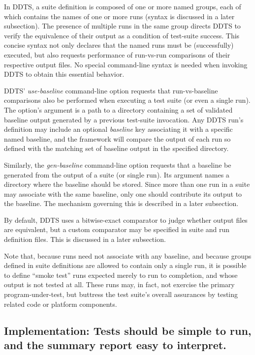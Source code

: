 \documentclass[conference]{IEEEtran}
\begin{document}
In DDTS, a suite definition is composed of one or more named groups, each of which contains the names of one or more runs (syntax is discussed in a later subsection). The presence of multiple runs in the same group directs DDTS to verify the equivalence of their output as a condition of test-suite success. This concise syntax not only declares that the named runs must be (successfully) executed, but also requests performance of run-vs-run comparisons of their respective output files. No special command-line syntax is needed when invoking DDTS to obtain this essential behavior.

DDTS' \emph{use-baseline} command-line option requests that run-vs-baseline comparisons also be performed when executing a test suite (or even a single run). The option's argument is a path to a directory containing a set of validated baseline output generated by a previous test-suite invocation. Any DDTS run's definition may include an optional \emph{baseline} key associating it with a specific named baseline, and the framework will compare the output of each run so defined with the matching set of baseline output in the specified directory.

Similarly, the \emph{gen-baseline} command-line option requests that a baseline be generated from the output of a suite (or single run). Its argument names a directory where the baseline should be stored. Since more than one run in a suite may associate with the same baseline, only one should contribute its output to the baseline. The mechanism governing this is described in a later subsection.

By default, DDTS uses a bitwise-exact comparator to judge whether output files are equivalent, but a custom comparator may be specified in suite and run definition files. This is discussed in a later subsection.

Note that, because runs need not associate with any baseline, and because groups defined in suite definitions are allowed to contain only a single run, it is possible to define ``smoke test'' runs expected merely to run to completion, and whose output is not tested at all. These runs may, in fact, not exercise the primary program-under-test, but buttress the test suite's overall assurances by testing related code or platform components.

\subsection{Implementation: Tests should be simple to run, and the summary report easy to interpret.}
\end{document}
